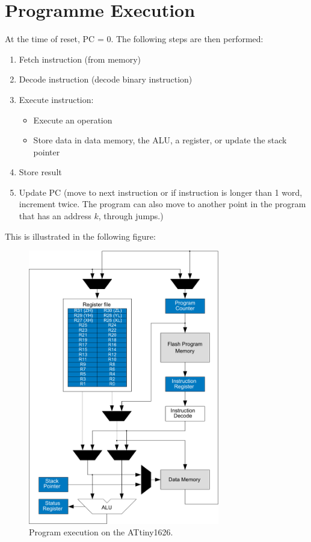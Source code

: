 \documentclass{report}
\begin{document}
\section{Programme Execution}
At the time of reset, PC = 0. The following steps are then performed:
\begin{enumerate}
    \item Fetch instruction (from memory)
    \item Decode instruction (decode binary instruction)
    \item Execute instruction:
          \begin{itemize}
              \item Execute an operation
              \item Store data in data memory, the ALU, a register, or update the stack pointer
          \end{itemize}
    \item Store result
    \item Update PC (move to next instruction or if instruction is longer than 1 word, increment twice. The program can also move to another point in the program that has an address \(k\), through jumps.)
\end{enumerate}
This is illustrated in the following figure:
\begin{figure}[H]
    \centering
    \includegraphics[height = 12cm, keepaspectratio = true]{figures/AVR_CPU.pdf}
    \caption{Program execution on the ATtiny1626.} %
\end{figure}
\end{document}
